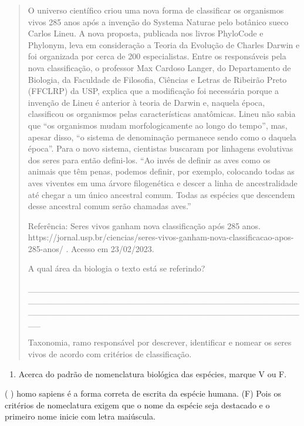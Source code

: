 \begin{quote}
O universo científico criou uma nova forma de classificar os organismos
vivos 285 anos após a invenção do Systema Naturae pelo botânico sueco
Carlos Lineu. A nova proposta, publicada nos livros PhyloCode e
Phylonym, leva em consideração a Teoria da Evolução de Charles Darwin e
foi organizada por cerca de 200 especialistas. Entre os responsáveis
pela nova classificação, o professor Max Cardoso Langer, do Departamento
de Biologia, da Faculdade de Filosofia, Ciências e Letras de Ribeirão
Preto (FFCLRP) da USP, explica que a modificação foi necessária porque a
invenção de Lineu é anterior à teoria de Darwin e, naquela época,
classificou os organismos pelas características anatômicas. Lineu não
sabia que ``os organismos mudam morfologicamente ao longo do tempo'',
mas, apesar disso, ``o sistema de denominação permanece sendo como o
daquela época''. Para o novo sistema, cientistas buscaram por linhagens
evolutivas dos seres para então defini-los. ``Ao invés de definir as
aves como os animais que têm penas, podemos definir, por exemplo,
colocando todas as aves viventes em uma árvore filogenética e descer a
linha de ancestralidade até chegar a um único ancestral comum. Todas as
espécies que descendem desse ancestral comum serão chamadas aves.''

Referência: Seres vivos ganham nova classificação após 285 anos.
https://jornal.usp.br/ciencias/seres-vivos-ganham-nova-classificacao-apos-285-anos/
. Acesso em 23/02/2023.

A qual área da biologia o texto está se referindo?

\_\_\_\_\_\_\_\_\_\_\_\_\_\_\_\_\_\_\_\_\_\_\_\_\_\_\_\_\_\_\_\_\_\_\_\_\_\_\_\_\_\_\_\_\_\_\_\_\_\_\_\_\_\_\_\_\_\_\_\_\_\_\_\_\_\_\_\_\_\_\_\_\_\_\_\_\_\_\_\_\_\_\_\_\_\_\_\_\_\_\_\_\_\_\_\_\_\_\_\_\_\_\_\_\_\_\_\_\_\_\_\_\_\_\_\_\_\_\_\_\_\_\_\_\_\_\_\_\_\_\_\_\_\_

Taxonomia, ramo responsável por descrever, identificar e nomear os seres
vivos de acordo com critérios de classificação.
\end{quote}

\begin{enumerate}
\def\labelenumi{\arabic{enumi}.}
\item
  Acerca do padrão de nomenclatura biológica das espécies, marque V ou
  F.
\end{enumerate}

( ) homo sapiens é a forma correta de escrita da espécie humana. (F)
Pois os critérios de nomeclatura exigem que o nome da espécie seja
destacado e o primeiro nome inicie com letra maiúscula.

